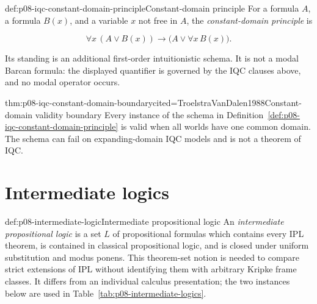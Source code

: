 \begin{hbdefinition}{def:p08-iqc-constant-domain-principle}{Constant-domain principle}
For a formula \(A\), a formula \(B(x)\), and a variable \(x\) not free in
\(A\), the \emph{constant-domain principle} is

\[
  \forall x\,(A\lor B(x))\to
  \bigl(A\lor\forall x\,B(x)\bigr).
\]

Its standing is an additional first-order intuitionistic schema.  It is not a
modal Barcan formula: the displayed quantifier is governed by the IQC clauses
above, and no modal operator occurs.
\end{hbdefinition}

\begin{hbtheorem}{thm:p08-iqc-constant-domain-boundary}{cited=TroelstraVanDalen1988}{Constant-domain validity boundary}
Every instance of the schema in
Definition~\ref{def:p08-iqc-constant-domain-principle} is valid when all
worlds have one common domain.  The schema can fail on expanding-domain IQC
models and is not a theorem of IQC.
\end{hbtheorem}

\section{Intermediate logics}

\begin{hbdefinition}{def:p08-intermediate-logic}{Intermediate propositional logic}
An \emph{intermediate propositional logic} is a set \(L\) of propositional
formulas which contains every IPL theorem, is contained in classical
propositional logic, and is closed under uniform substitution and modus
ponens.  This theorem-set notion is needed to compare strict extensions of
IPL without identifying them with arbitrary Kripke frame classes.  It differs
from an individual calculus presentation; the two instances below are used in
Table~\ref{tab:p08-intermediate-logics}.
\end{hbdefinition}


